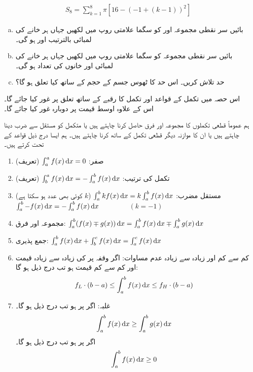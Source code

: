 \begin{align*}
S_8=\sum\limits_{k=1}^{8}\pi[16-(-1+(k-1))^2]
\end{align*}
\begin{enumerate}[a.]
\item
بائیں سر نقطی مجموعہ  اور  کو سگما علامتی روپ میں لکھیں جہاں ہر خانے کی لمبائی بالترتیب  اور  ہو گی۔
\item
بائیں سر نقطی مجموعہ   کو سگما علامتی روپ میں لکھیں جہاں ہر خانے کی لمبائی  اور خانوں کی تعداد  ہو گی۔
\item
حد  تلاش کریں۔ اس حد کا ٹھوس جسم کے حجم کے ساتھ کیا تعلق ہو گا؟
\end{enumerate}

اس حصہ میں تکمل کے قواعد اور تکمل کا رقبے کے ساتھ تعلق پر غور کیا جائے گا۔ اس کے علاوہ اوسط قیمت پر دوبارہ غور کیا جائے گا۔

ہم عموماً قطعی تکملوں کا مجموعہ اور فرق حاصل کرنا چاہتے ہیں یا متکمل کو مستقل سے ضرب دینا چاہتے ہیں یا ان کا موازنہ دیگر قطعی تکمل کے ساتھ کرنا چاہتے ہیں۔ ہم ایسا درج ذیل قواعد کے تحت کرتے ہیں۔

\begin{enumerate}[1.]
\item
صفر: \quad
$\int_a^af(x)\dif x=0$ \quad
(تعریف)
\item
تکمل کی ترتیب:\quad
$\int_b^af(x)\dif x=-\int_a^bf(x)\dif x$\quad
(تعریف)
\item
مستقل مضرب:\quad
$\int_a^bkf(x)\dif x=k\int_a^bf(x)\dif x$\quad
($k$ کوئی بھی عدد ہو سکتا ہے)\\
$\int_a^b-f(x)\dif x=-\int_a^bf(x)\dif x\quad\quad\quad\quad$\quad
$(k=-1)$
\item
مجموعہ اور فرق:\quad
$\int_a^b(f(x)\mp g(x))\dif x=\int_a^bf(x)\dif x\mp \int_a^bg(x)\dif x$
\item
جمع پذیری:\quad
$\int_a^bf(x)\dif x+\int_b^cf(x)\dif x=\int_a^cf(x)\dif x$
\item
کم سے کم اور زیادہ سے زیادہ عدم مساوات:\quad
 اگر وقفہ  پر  کی زیادہ سے زیادہ قیمت  اور کم سے کم قیمت  ہو تب درج ذیل ہو گا:
\begin{align*}
f_L\cdot (b-a)\le \int_a^b f(x)\dif x\le f_H\cdot (b-a)
\end{align*}
\item
غلبہ:\quad
اگر  پر  ہو تب  درج ذیل ہو گا۔
\begin{align*}
\int_a^bf(x)\dif x\ge \int_a^bg(x)\dif x
\end{align*}
اگر  پر  ہو تب درج ذیل ہو گا۔
\begin{align*}
\int_a^bf(x)\dif x\ge 0
\end{align*}
\end{enumerate}

